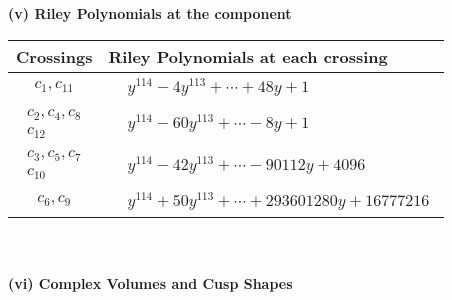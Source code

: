 \documentclass[1p]{elsarticle_modified}
\theoremstyle{definition}
\begin{document}
\newpage\renewcommand{\arraystretch}{1}
\flushleft \textbf{(v) Riley Polynomials at the component}\newline \\
\begin{tabular}{m{50pt}|m{274pt}}
Crossings & \hspace{64pt}Riley Polynomials at each crossing \\
\hline $$\begin{aligned}c_{1},c_{11}\end{aligned}$$&$\begin{aligned}
&y^{114}-4 y^{113}+\cdots+48 y+1
\end{aligned}$\\
\hline $$\begin{aligned}c_{2},c_{4},c_{8}\\c_{12}\end{aligned}$$&$\begin{aligned}
&y^{114}-60 y^{113}+\cdots-8 y+1
\end{aligned}$\\
\hline $$\begin{aligned}c_{3},c_{5},c_{7}\\c_{10}\end{aligned}$$&$\begin{aligned}
&y^{114}-42 y^{113}+\cdots-90112 y+4096
\end{aligned}$\\
\hline $$\begin{aligned}c_{6},c_{9}\end{aligned}$$&$\begin{aligned}
&y^{114}+50 y^{113}+\cdots+293601280 y+16777216
\end{aligned}$\\
\hline
\end{tabular}\\~\\
\newpage\flushleft \textbf{(vi) Complex Volumes and Cusp Shapes}
\end{document}
